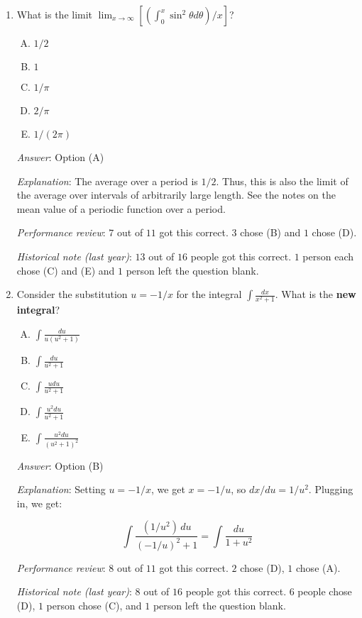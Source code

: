\documentclass[10pt]{amsart}
\begin{document}
\begin{enumerate}
\item What is the limit $\lim_{x \to \infty} \left[\left(\int_0^x
  \sin^2 \theta d\theta\right)/x\right]$?

  \begin{enumerate}[(A)]
  \item $1/2$
  \item $1$
  \item $1/\pi$
  \item $2/\pi$
  \item $1/(2\pi)$
  \end{enumerate}

  {\em Answer}: Option (A)

  {\em Explanation}: The average over a period is $1/2$. Thus, this is
  also the limit of the average over intervals of arbitrarily large
  length. See the notes on the mean value of a periodic function over
  a period.

  {\em Performance review}: $7$ out of $11$ got this correct. $3$
  chose (B) and $1$ chose (D).

  {\em Historical note (last year)}: $13$ out of $16$ people got this
  correct. $1$ person each chose (C) and (E) and $1$ person left the
  question blank.

\item Consider the substitution $u = -1/x$ for the integral $\int
  \frac{dx}{x^2 + 1}$. What is the {\bf new integral}?

  \begin{enumerate}[(A)]
  \item $\int \frac{du}{u(u^2 + 1)}$
  \item $\int \frac{du}{u^2 + 1}$
  \item $\int \frac{ u du}{u^2 + 1}$
  \item $\int \frac{u^2 du}{u^2 + 1}$
  \item $\int \frac{u^2 du}{(u^2 + 1)^2}$ 
  \end{enumerate}

  {\em Answer}: Option (B)

  {\em Explanation}: Setting $u = -1/x$, we get $x = -1/u$, so $dx/du
  = 1/u^2$. Plugging in, we get:

  $$\int \frac{(1/u^2) \, du}{(-1/u)^2 + 1} = \int \frac{du}{1 + u^2}$$

  {\em Performance review}: $8$ out of $11$ got this correct. $2$
  chose (D), $1$ chose (A).

  {\em Historical note (last year)}: $8$ out of $16$ people got this
  correct. $6$ people chose (D), $1$ person chose (C), and $1$ person
  left the question blank.


\end{enumerate}
\end{document}

